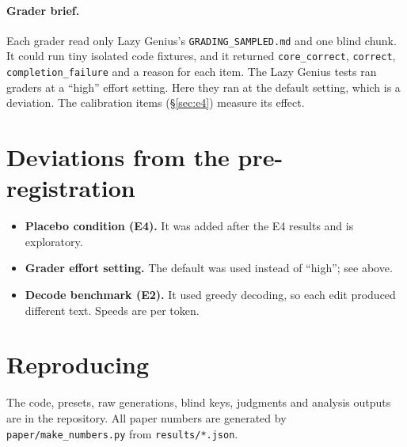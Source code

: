 \paragraph{Grader brief.} Each grader read only Lazy Genius's \texttt{GRADING\_SAMPLED.md} and one blind chunk. It could run tiny isolated code fixtures, and it returned \texttt{core\_correct}, \texttt{correct}, \texttt{completion\_failure} and a reason for each item. The Lazy Genius tests ran graders at a ``high'' effort setting. Here they ran at the default setting, which is a deviation. The calibration items (\S\ref{sec:e4}) measure its effect.

\section{Deviations from the pre-registration}
\begin{itemize}
\item \textbf{Placebo condition (E4).} It was added after the E4 results and is exploratory.
\item \textbf{Grader effort setting.} The default was used instead of ``high''; see above.
\item \textbf{Decode benchmark (E2).} It used greedy decoding, so each edit produced different text. Speeds are per token.
\end{itemize}

\section{Reproducing}
The code, presets, raw generations, blind keys, judgments and analysis outputs are in the repository. All paper numbers are generated by \texttt{paper/make\_numbers.py} from \texttt{results/*.json}.
